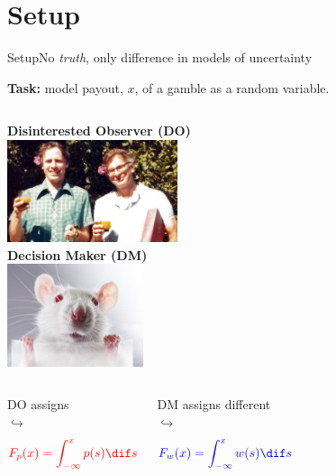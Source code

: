 \section{Setup}
\begin{frame}{Setup}{No \textit{truth}, only difference in models of uncertainty}
\begin{center}
\textbf{Task:} model payout, $x$, of a gamble as a random variable.
\end{center}
\begin{columns}[T]
	\centering
	\textbf{Disinterested Observer (DO)} \\
	\vspace{0.5em}
	\includegraphics[height=3cm]{img/TverskyKahnemanFunny} \\
	\vspace{0.5em}
	\centering
	\textbf{Decision Maker (DM)} \\
	\vspace{0.5em}
	\includegraphics[height=3cm]{img/LabRat} \\
	\vspace{0.5em}
\end{columns}

\begin{columns}[T]
	\vspace{1em}
	DO assigns  \\
  $\hookrightarrow$ %
  $$  \red{F_p(x)=\int_{-\infty}^x p(s) \dif s} $$
  
	\vspace{1em}
  DM assigns different \\
  $\hookrightarrow$ %
 $$ \blue{F_w(x)=\int_{-\infty}^x w(s) \dif s} $$
  
\end{columns}
\end{frame}

